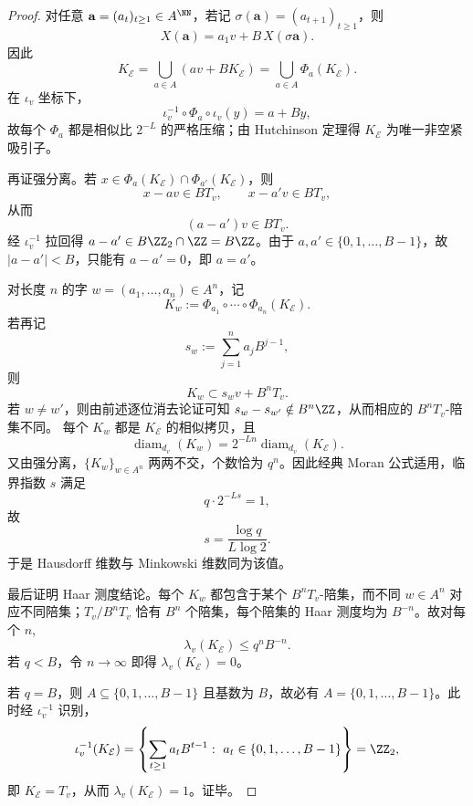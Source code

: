 \begin{proof}
对任意 \(\mathbf a=(a_t)_{t\ge 1}\in A^\NN\)，若记 \(\sigma(\mathbf a)=(a_{t+1})_{t\ge 1}\)，则
\[
X(\mathbf a)=a_1v+B\,X(\sigma\mathbf a).
\]
因此
\[
K_{\mathcal E}=\bigcup_{a\in A}(av+BK_{\mathcal E})=\bigcup_{a\in A}\Phi_a(K_{\mathcal E}).
\]
在 \(\iota_v\) 坐标下，
\[
\iota_v^{-1}\circ \Phi_a\circ \iota_v(y)=a+By,
\]
故每个 \(\Phi_a\) 都是相似比 \(2^{-L}\) 的严格压缩；由 Hutchinson 定理得 \(K_{\mathcal E}\) 为唯一非空紧吸引子。

再证强分离。若 \(x\in \Phi_a(K_{\mathcal E})\cap \Phi_{a'}(K_{\mathcal E})\)，则
\[
x-av\in BT_v,\qquad x-a'v\in BT_v,
\]
从而
\[
(a-a')v\in BT_v.
\]
经 \(\iota_v^{-1}\) 拉回得 \(a-a'\in B\ZZ_2\cap \ZZ=B\ZZ\)。由于 \(a,a'\in\{0,1,\dots,B-1\}\)，故 \(|a-a'|<B\)，只能有 \(a-a'=0\)，即 \(a=a'\)。

对长度 \(n\) 的字 \(w=(a_1,\dots,a_n)\in A^n\)，记
\[
K_w:=\Phi_{a_1}\circ\cdots\circ\Phi_{a_n}(K_{\mathcal E}).
\]
若再记
\[
s_w:=\sum_{j=1}^{n}a_jB^{j-1},
\]
则
\[
K_w\subset s_wv+B^nT_v.
\]
若 \(w\neq w'\)，则由前述逐位消去论证可知 \(s_w-s_{w'}\notin B^n\ZZ\)，从而相应的 \(B^nT_v\)-陪集不同。
每个 \(K_w\) 都是 \(K_{\mathcal E}\) 的相似拷贝，且
\[
\operatorname{diam}_{d_v}(K_w)=2^{-Ln}\operatorname{diam}_{d_v}(K_{\mathcal E}).
\]
又由强分离，\(\{K_w\}_{w\in A^n}\) 两两不交，个数恰为 \(q^n\)。因此经典 Moran 公式适用，临界指数 \(s\) 满足
\[
q\cdot 2^{-Ls}=1,
\]
故
\[
s=\frac{\log q}{L\log 2}.
\]
于是 Hausdorff 维数与 Minkowski 维数同为该值。

最后证明 Haar 测度结论。每个 \(K_w\) 都包含于某个 \(B^nT_v\)-陪集，而不同 \(w\in A^n\) 对应不同陪集；\(T_v/B^nT_v\) 恰有 \(B^n\) 个陪集，每个陪集的 Haar 测度均为 \(B^{-n}\)。故对每个 \(n\),
\[
\lambda_v(K_{\mathcal E})\le q^n B^{-n}.
\]
若 \(q<B\)，令 \(n\to\infty\) 即得 \(\lambda_v(K_{\mathcal E})=0\)。

若 \(q=B\)，则 \(A\subseteq\{0,1,\dots,B-1\}\) 且基数为 \(B\)，故必有 \(A=\{0,1,\dots,B-1\}\)。此时经 \(\iota_v^{-1}\) 识别，
\[
\iota_v^{-1}(K_{\mathcal E})
=
\left\{\sum_{t\ge 1}a_tB^{t-1}:\ a_t\in\{0,1,\dots,B-1\}\right\}
=\ZZ_2,
\]
即 \(K_{\mathcal E}=T_v\)，从而 \(\lambda_v(K_{\mathcal E})=1\)。证毕。
\end{proof}

